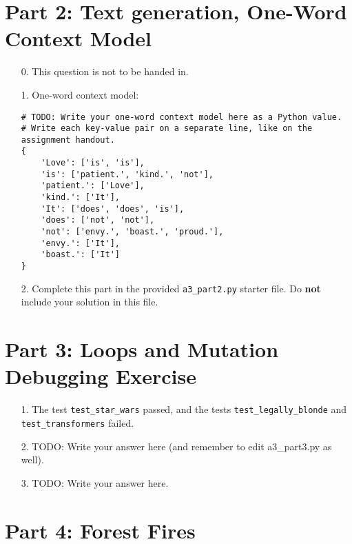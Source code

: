 \documentclass[fontsize=11pt]{article}
\begin{document}
\newpage

\section*{Part 2: Text generation, One-Word Context Model}

\begin{enumerate}

\item[0.]
This question is not to be handed in.

\item[1.]
One-word context model:

\begin{verbatim}
# TODO: Write your one-word context model here as a Python value.
# Write each key-value pair on a separate line, like on the assignment handout.
{
    'Love': ['is', 'is'],
    'is': ['patient.', 'kind.', 'not'],
    'patient.': ['Love'],
    'kind.': ['It'],
    'It': ['does', 'does', 'is'],
    'does': ['not', 'not'],
    'not': ['envy.', 'boast.', 'proud.'],
    'envy.': ['It'],
    'boast.': ['It']
}
\end{verbatim}

\item[2.]
Complete this part in the provided \texttt{a3\_part2.py} starter file.
Do \textbf{not} include your solution in this file.

\end{enumerate}

\newpage

\section*{Part 3: Loops and Mutation Debugging Exercise}

\begin{enumerate}
\item[1.]
The test \texttt{test\_star\_wars} passed, and the tests 
\texttt{test\_legally\_blonde} and \texttt{test\_transformers} failed.

\item[2.]
TODO: Write your answer here (and remember to edit a3\_part3.py as well).

\item[3.]
TODO: Write your answer here.
\end{enumerate}

\section*{Part 4: Forest Fires}
\end{document}
